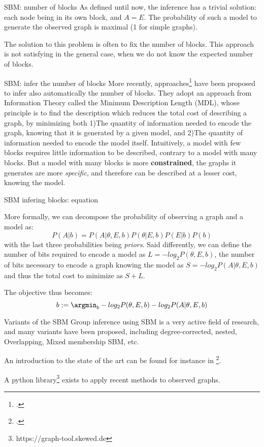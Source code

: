\begin{textbox}{SBM: number of blocks}
    As defined until now, the inference has a trivial solution: each node being in its own block, and $A=E$. The probability of such a model to generate the observed graph is maximal (1 for simple graphs).

    The solution to this problem is often to fix the number of blocks. This approach is not satisfying in the general case, when we do not know the expected number of blocks.
\end{textbox}

\begin{textbox}{SBM: infer the number of blocks}
    More recently, approaches\footcite{peixoto2019bayesian} have been proposed to infer also automatically the number of blocks. They adopt an approach from Information Theory called the Minimum Description Length (MDL), whose principle is to find the description which reduces the total cost of describing a graph, by minimizing both 1)The quantity of information needed to encode the graph, knowing that it is generated by a given model, and 2)The quantity of information needed to encode the model itself. Intuitively, a model with few blocks requires little information to be described, contrary to a model with many blocks. But a model with many blocks is more \textbf{constrained}, the graphs it generates are more \textit{specific}, and therefore can be described at a lesser cost, knowing the model.

\end{textbox}

\begin{textbox}{SBM infering blocks: equation}

    More formally, we can decompose the probability of observing a graph and a model as:
    \[
        P(A|b)= P(A|\theta, E, b) P(\theta|E, b) P(E|b)P (b)
    \]
    with the last three probabilities being \textit{priors}.  Said differently, we can define the number of bits required to encode a model as $L = -log_2 P(\theta,E,b)$, the number of bits necessary to encode a graph knowing the model as $S = -log_2 P(A|\theta,E,b)$ and thus the total cost to minimize as $S+L$.

    The objective thus becomes:
    \[
        b:=\argmin_{b} - log_2 P(\theta,E,b) - log_2 P(A|\theta,E,b)
    \]
\end{textbox}

\begin{textbox}{Variants of the SBM}
    Group inference using SBM is a very active field of research, and many variants have been proposed, including degree-corrected, nested, Overlapping, Mixed membership SBM, etc.

    An introduction to the state of the art can be found for instance in \footcite{lee2019review}.

    A python library\footnote{https://graph-tool.skewed.de} exists to apply recent methods to observed graphs.
\end{textbox}


